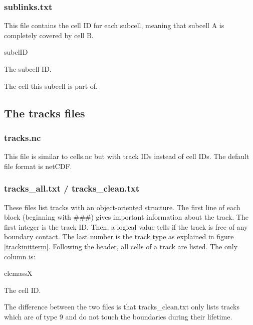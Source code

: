 \documentclass{scrartcl}
\begin{document}
\subsubsection{sublinks.txt}
This file contains the cell ID for each subcell, meaning that subcell A is completely covered by cell B.
\begin{labeling}{subclID}
    \item[subclID] The subcell ID.
    \item[clID] The cell this subcell is part of.
    
\end{labeling}


\subsection{The tracks files}
\subsubsection{tracks.nc}
This file is similar to cells.nc but with track IDs instead of cell IDs. The default file format is netCDF.

\subsubsection{tracks\_all.txt / tracks\_clean.txt}
These files list tracks with an object-oriented structure. The first line of each block (beginning with \#\#\#) gives important information about the track. The first integer is the track ID. Then, a logical value tells if the track is free of any boundary contact. The last number is the track type as explained in figure \ref{trackinitterm}. Following the header, all cells of a track are listed. The only column is:
\begin{labeling}{clcmassX}
	\item[clID] The cell ID.
\end{labeling}
The difference between the two files is that tracks\_clean.txt only lists tracks which are of type 9 and do not touch the boundaries during their lifetime. 
\end{document}
